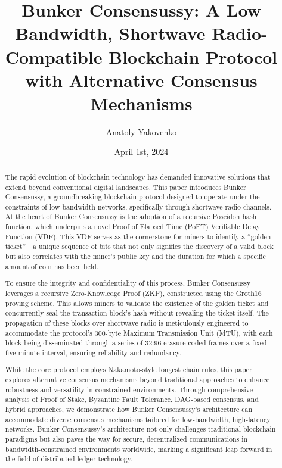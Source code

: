\documentclass[11pt,a4paper]{article}
\title{Bunker Consensussy: A Low Bandwidth, Shortwave Radio-Compatible Blockchain Protocol with Alternative Consensus Mechanisms}
\author{Anatoly Yakovenko}
\date{April 1st, 2024}
\begin{document}
\maketitle

\begin{abstract}
The rapid evolution of blockchain technology has demanded innovative solutions that extend beyond conventional digital landscapes. This paper introduces Bunker Consensussy, a groundbreaking blockchain protocol designed to operate under the constraints of low bandwidth networks, specifically through shortwave radio channels. At the heart of Bunker Consensussy is the adoption of a recursive Poseidon hash function, which underpins a novel Proof of Elapsed Time (PoET) Verifiable Delay Function (VDF). This VDF serves as the cornerstone for miners to identify a ``golden ticket''---a unique sequence of bits that not only signifies the discovery of a valid block but also correlates with the miner's public key and the duration for which a specific amount of coin has been held.

To ensure the integrity and confidentiality of this process, Bunker Consensussy leverages a recursive Zero-Knowledge Proof (ZKP), constructed using the Groth16 proving scheme. This allows miners to validate the existence of the golden ticket and concurrently seal the transaction block's hash without revealing the ticket itself. The propagation of these blocks over shortwave radio is meticulously engineered to accommodate the protocol's 300-byte Maximum Transmission Unit (MTU), with each block being disseminated through a series of 32:96 erasure coded frames over a fixed five-minute interval, ensuring reliability and redundancy.

While the core protocol employs Nakamoto-style longest chain rules, this paper explores alternative consensus mechanisms beyond traditional approaches to enhance robustness and versatility in constrained environments. Through comprehensive analysis of Proof of Stake, Byzantine Fault Tolerance, DAG-based consensus, and hybrid approaches, we demonstrate how Bunker Consensussy's architecture can accommodate diverse consensus mechanisms tailored for low-bandwidth, high-latency networks. Bunker Consensussy's architecture not only challenges traditional blockchain paradigms but also paves the way for secure, decentralized communications in bandwidth-constrained environments worldwide, marking a significant leap forward in the field of distributed ledger technology.
\end{abstract}
\end{document}
